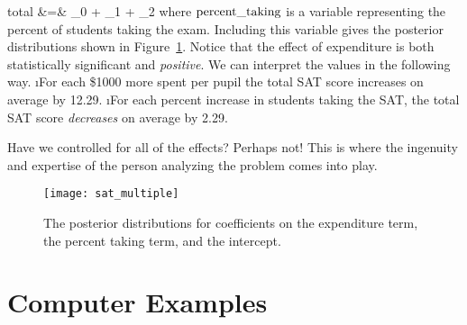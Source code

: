 \beqn
{\rm total} &=& \beta_{0} + \beta_{1} + \beta_{2}
\eeqn
where $\rm percent\_taking$ is a variable representing the percent of students taking the exam.  Including this variable gives the posterior distributions shown in Figure~\ref{fig:sat_multiple}.  Notice that the effect of expenditure is both statistically significant and \emph{positive}.  We can interpret the values in the following way.
\bi
\i For each \$1000 more spent per pupil the total SAT score increases on average by 12.29.
\i For each percent increase in students taking the SAT, the total SAT score \emph{decreases} on average by 2.29.
\ei

Have we controlled for all of the effects?  Perhaps not!  This is where the ingenuity and expertise of the person analyzing the problem comes into play.


\begin{figure}
\texttt{[image: sat\_multiple]}
\caption{The posterior distributions for coefficients on the expenditure term, the percent taking term, and the intercept.}\label{fig:sat_multiple}
\end{figure}



\section{Computer Examples}
\begin{fullwidth}

\end{fullwidth}